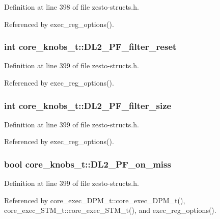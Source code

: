 Definition at line 398 of file zesto-structs.h.

Referenced by exec\_\-reg\_\-options().
\subsubsection[{DL2\_\-PF\_\-filter\_\-reset}]{\setlength{\rightskip}{0pt plus 5cm}int {\bf core\_\-knobs\_\-t::DL2\_\-PF\_\-filter\_\-reset}}\label{structcore__knobs__t_ddbcecc7eb865b74573d0260fe70927a}




Definition at line 399 of file zesto-structs.h.

Referenced by exec\_\-reg\_\-options().
\subsubsection[{DL2\_\-PF\_\-filter\_\-size}]{\setlength{\rightskip}{0pt plus 5cm}int {\bf core\_\-knobs\_\-t::DL2\_\-PF\_\-filter\_\-size}}\label{structcore__knobs__t_088df9b7de300327e44851c4eb1da44d}




Definition at line 399 of file zesto-structs.h.

Referenced by exec\_\-reg\_\-options().
\subsubsection[{DL2\_\-PF\_\-on\_\-miss}]{\setlength{\rightskip}{0pt plus 5cm}bool {\bf core\_\-knobs\_\-t::DL2\_\-PF\_\-on\_\-miss}}\label{structcore__knobs__t_41533c60a994d26ca8f1416e9d97e0fa}




Definition at line 399 of file zesto-structs.h.

Referenced by core\_\-exec\_\-DPM\_\-t::core\_\-exec\_\-DPM\_\-t(), core\_\-exec\_\-STM\_\-t::core\_\-exec\_\-STM\_\-t(), and exec\_\-reg\_\-options().
